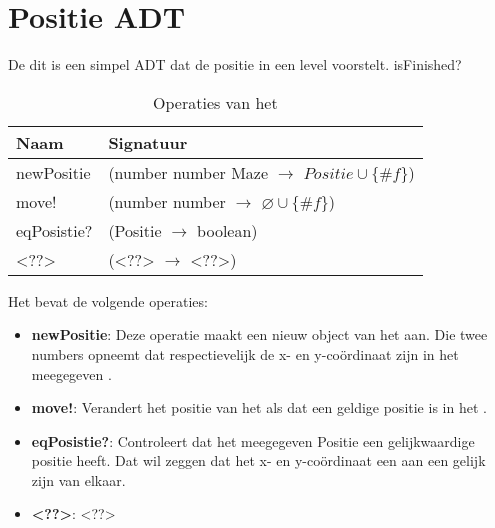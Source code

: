 \section{Positie ADT}
\label{section:positie}

De \texttt{} dit is een simpel ADT dat de positie in een level voorstelt.
isFinished?

\begin{table}[hbt]
\centering
\begin{tabular}{|ll|}
\hline
\rowcolor[HTML]{000000} 
{\color[HTML]{FFFFFF} \textbf{Naam}} & {\color[HTML]{FFFFFF} \textbf{Signatuur}} \\ \hline
newPositie                          & (number number Maze $\rightarrow$ $Positie\cup\{\#f\}$)                                       \\ \hline
move!                                & (number number $\rightarrow$ $\varnothing\cup\{\#f\}$)                                       \\ \hline
 eqPosistie?                                & (Positie $\rightarrow$ boolean)                                       \\ \hline
 <??>                                & (<??> $\rightarrow$ <??>)                                       \\ \hline
\end{tabular}
\caption{Operaties van het \texttt{}}
\label{table:positie}
\end{table}

Het \texttt{} bevat de volgende operaties:

\begin{itemize}
	\item \textbf{newPositie}: Deze operatie maakt een nieuw object van het \texttt{} aan. 
		Die twee numbers opneemt dat respectievelijk de x- en y-co\"ordinaat zijn in het meegegeven \texttt{}.
	\item \textbf{move!}: Verandert het positie van het \texttt{} als dat een geldige positie is in het \texttt{}.
	\item \textbf{eqPosistie?}: Controleert dat het meegegeven Positie een gelijkwaardige positie heeft.
		Dat wil zeggen dat het x- en y-co\"ordinaat een aan een gelijk zijn van elkaar. 
	\item \textbf{<??>}: <??>
\end{itemize}

